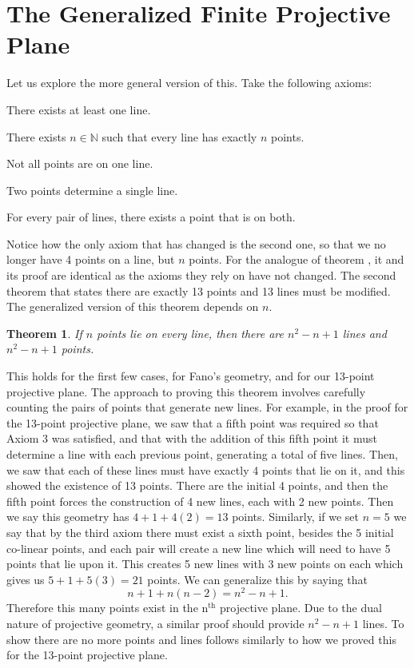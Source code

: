 \documentclass{article}
\newenvironment{axioms}
 {\enumerate[label=\textbf{A\arabic*.}, ref=A\arabic*]}
 {\endenumerate}
\newtheorem{theorem}{Theorem}[section]
\begin{document}
\section{The Generalized Finite Projective Plane}
Let us explore the more general version of this. Take the following axioms:

\begin{axioms}
  \item There exists at least one line.
  \item There exists $n \in \mathbb{N}$ such that every line has exactly $n$ points.
  \item Not all points are on one line.
  \item Two points determine a single line.
  \item For every pair of lines, there exists a point that is on both.
\end{axioms}

Notice how the only axiom that has changed is the second one, so that we no longer have 4 points on a line, but $n$ points. For the analogue of theorem , it and its proof are identical as the axioms they rely on have not changed. The second theorem that states there are exactly 13 points and 13 lines must be modified. The generalized version of this theorem depends on $n$.

\begin{theorem}
If $n$ points lie on every line, then there are $n^2 - n + 1$ lines and  $n^2 - n + 1$ points.
\end{theorem}

This holds for the first few cases, for Fano's geometry, and for our 13-point projective plane. The approach to proving this theorem involves carefully counting the pairs of points that generate new lines. For example, in the proof for the 13-point projective plane, we saw that a fifth point was required so that Axiom 3 was satisfied, and that with the addition of this fifth point it must determine a line with each previous point, generating a total of five lines. Then, we saw that each of these lines must have exactly 4 points that lie on it, and this showed the existence of 13 points. There are the initial 4 points, and then the fifth point forces the construction of 4 new lines, each with 2 new points. Then we say this geometry has $4 + 1 + 4(2) = 13$ points. Similarly, if we set $n=5$ we say that by the third axiom there must exist a sixth point, besides the 5 initial co-linear points, and each pair will create a new line which will need to have 5 points that lie upon it. This creates 5 new lines with 3 new points on each which gives us $5 + 1 + 5(3) = 21$ points. We can generalize this by saying that 
\[n + 1 + n(n-2) = n^2 - n +1. \] Therefore this many points exist in the n$^{\text{th}}$ projective plane. Due to the dual nature of projective geometry, a similar proof should provide $n^2-n+1$ lines. To show there are no more points and lines follows similarly to how we proved this for the 13-point projective plane.
\end{document}
